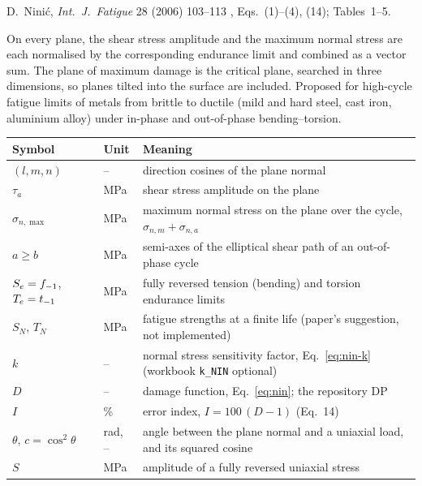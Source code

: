 \label{sheet:NINIC}

 D.~Nini\'c, \emph{Int.\ J.\ Fatigue} 28 (2006) 103--113 \cite{ninic2006}, Eqs.~(1)--(4),
(14); Tables~1--5.

 On every plane, the shear stress amplitude and the maximum normal stress are
each normalised by the corresponding endurance limit and combined as a vector sum. The plane of
maximum damage is the critical plane, searched in three dimensions, so planes tilted into the surface
are included. Proposed for high-cycle fatigue limits of metals from brittle to ductile (mild and hard
steel, cast iron, aluminium alloy) under in-phase and out-of-phase bending--torsion.

\begin{center}\small
\begin{tabular}{@{}llp{100mm}@{}}
\toprule
Symbol & Unit & Meaning\\\midrule
$(l,m,n)$ & -- & direction cosines of the plane normal\\
$\tau_a$ & MPa & shear stress amplitude on the plane\\
$\sigma_{n,\max}$ & MPa & maximum normal stress on the plane over the cycle, $\sigma_{n,m}+\sigma_{n,a}$\\
$a\ge b$ & MPa & semi-axes of the elliptical shear path of an out-of-phase cycle\\
$S_e=f_{-1}$, $T_e=t_{-1}$ & MPa & fully reversed tension (bending) and torsion endurance limits\\
$S_N$, $T_N$ & MPa & fatigue strengths at a finite life (paper's suggestion, not implemented)\\
$k$ & -- & normal stress sensitivity factor, Eq.~\eqref{eq:nin-k} (workbook \texttt{k\_NIN} optional)\\
$D$ & -- & damage function, Eq.~\eqref{eq:nin}; the repository DP\\
$I$ & \% & error index, $I=100\,(D-1)$ (Eq.~14)\\
$\theta$, $c=\cos^2\theta$ & rad, -- & angle between the plane normal and a uniaxial load, and its squared cosine\\
$S$ & MPa & amplitude of a fully reversed uniaxial stress\\
\bottomrule
\end{tabular}
\end{center}

